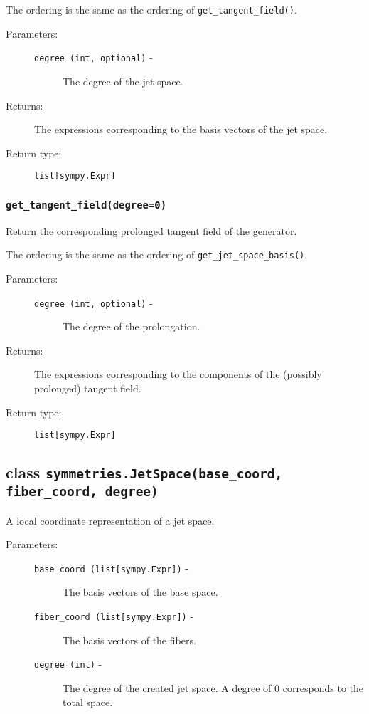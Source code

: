       The ordering is the same as the ordering of \lstinline{get_tangent_field()}.

      \begin{description}
         \item[Parameters:] \leavevmode
           \begin{description}
               \item[\lstinline{degree (int, optional)} -] The degree of the jet space.
           \end{description}
         \item[Returns:] The expressions corresponding to the basis vectors of the jet space.
         \item[Return type:] \lstinline{list[sympy.Expr]}
      \end{description}

   \subsubsection*{\lstinline{get_tangent_field(degree=0)}}

      Return the corresponding prolonged tangent field of the
      generator.

      The ordering is the same as the ordering of \lstinline{get_jet_space_basis()}.

      \begin{description}
         \item[Parameters:] \leavevmode
           \begin{description}
               \item[\lstinline{degree (int, optional)} -] The degree of the prolongation.
           \end{description}
         \item[Returns:] The expressions corresponding to the components of the (possibly prolonged) tangent field.
         \item[Return type:] \lstinline{list[sympy.Expr]}
      \end{description}

\subsection*{class \lstinline{symmetries.JetSpace(base_coord, fiber_coord, degree)}}

   A local coordinate representation of a jet space.

   \begin{description}
      \item[Parameters:] \leavevmode
        \begin{description}
            \item[\lstinline{base_coord (list[sympy.Expr])} -] The basis vectors of the base space.
            \item[\lstinline{fiber_coord (list[sympy.Expr])} -] The basis vectors of the fibers.
            \item[\lstinline{degree (int)} -] The degree of the created jet space. A degree of 0 corresponds to the total space.
        \end{description}     
   \end{description}

